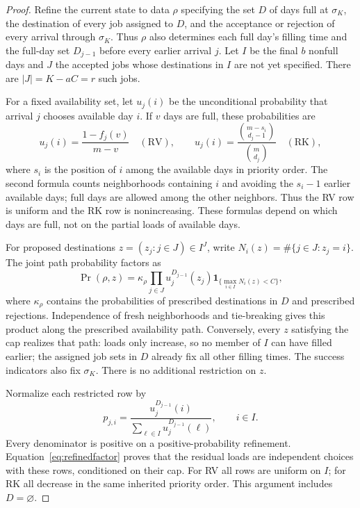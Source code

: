 \documentclass[11pt]{article}
\newcommand{\RV}{\mathrm{RV}}
\newcommand{\RK}{\mathrm{RK}}
\begin{document}
\begin{proof}
Refine the current state to data $\rho$ specifying the set $D$ of
days full at $\sigma_K$, the
destination of every job assigned to $D$, and the acceptance or
rejection of every arrival through $\sigma_K$. Thus $\rho$ also
determines each full day's filling time and the full-day set
$D_{j-1}$ before every earlier arrival $j$. Let $I$ be the final
$b$ nonfull days and $J$ the accepted jobs whose destinations in
$I$ are not yet specified. There are $|J|=K-aC=r$ such jobs.

For a fixed availability set, let $u_j(i)$ be the unconditional
probability that arrival $j$ chooses available day $i$. If $v$ days
are full, these probabilities are
\[
 u_j(i)=\frac{1-f_j(v)}{m-v}\quad(\RV),\qquad
 u_j(i)=\frac{\binom{m-s_i}{d_j-1}}{\binom m{d_j}}
       \quad(\RK),
\]
where $s_i$ is the position of $i$ among the available days in
priority order. The second formula counts neighborhoods containing
$i$ and avoiding the $s_i-1$ earlier available days; full days
are allowed among the other neighbors. Thus the RV row is uniform
and the RK row is nonincreasing. These formulas depend on which
days are full, not on the partial loads of available days.

For proposed destinations $z=(z_j:j\in J)\in I^J$, write
$N_i(z)=\#\{j\in J:z_j=i\}$. The joint path probability factors as
\begin{equation}\label{eq:refinedfactor}
 \Pr(\rho,z)=\kappa_\rho
      \prod_{j\in J}u_j^{D_{j-1}}(z_j)
      \mathbf1_{\{\max_{i\in I}N_i(z)<C\}},
\end{equation}
where $\kappa_\rho$ contains the probabilities of prescribed
destinations in $D$ and prescribed rejections. Independence of fresh
neighborhoods and tie-breaking gives this product along the prescribed
availability path. Conversely, every $z$ satisfying the cap realizes
that path: loads only increase, so no member of $I$ can have filled
earlier; the assigned job sets in $D$ already fix all other filling
times. The success indicators also fix $\sigma_K$.
There is no additional restriction on $z$.

Normalize each restricted row by
\[
 p_{j,i}=\frac{u_j^{D_{j-1}}(i)}
                  {\sum_{\ell\in I}u_j^{D_{j-1}}(\ell)},
 \qquad i\in I.
\]
Every denominator is positive on a positive-probability refinement.
Equation~\eqref{eq:refinedfactor} proves that the residual loads
are independent choices with these rows, conditioned on their cap.
For RV all rows are uniform on $I$; for RK all decrease in the
same inherited priority order. This argument includes $D=\varnothing$.


\end{proof}
\end{document}

